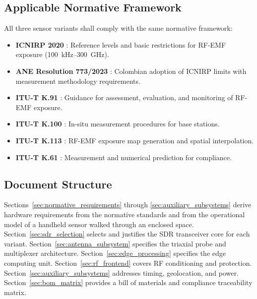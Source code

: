 \documentclass[11pt,a4paper]{article}
\begin{document}
\subsection{Applicable Normative Framework}

All three sensor variants shall comply with the same normative framework:

\begin{itemize}
    \item \textbf{ICNIRP 2020} \cite{icnirp2020}: Reference levels and basic restrictions for RF-EMF exposure (100~kHz--300~GHz).
    \item \textbf{ANE Resolution 773/2023} \cite{ane_res773_2023}: Colombian adoption of ICNIRP limits with measurement methodology requirements.
    \item \textbf{ITU-T K.91} \cite{itut_k91}: Guidance for assessment, evaluation, and monitoring of RF-EMF exposure.
    \item \textbf{ITU-T K.100} \cite{itut_k100}: In-situ measurement procedures for base stations.
    \item \textbf{ITU-T K.113} \cite{itut_k113}: RF-EMF exposure map generation and spatial interpolation.
    \item \textbf{ITU-T K.61} \cite{itut_k61}: Measurement and numerical prediction for compliance.
\end{itemize}

\subsection{Document Structure}

Sections~\ref{sec:normative_requirements} through \ref{sec:auxiliary_subsystems} derive hardware requirements from the normative standards and from the operational model of a handheld sensor walked through an enclosed space. Section~\ref{sec:sdr_selection} selects and justifies the SDR transceiver core for each variant. Section~\ref{sec:antenna_subsystem} specifies the triaxial probe and multiplexer architecture. Section~\ref{sec:edge_processing} specifies the edge computing unit. Section~\ref{sec:rf_frontend} covers RF conditioning and protection. Section~\ref{sec:auxiliary_subsystems} addresses timing, geolocation, and power. Section~\ref{sec:bom_matrix} provides a bill of materials and compliance traceability matrix.

\end{document}
